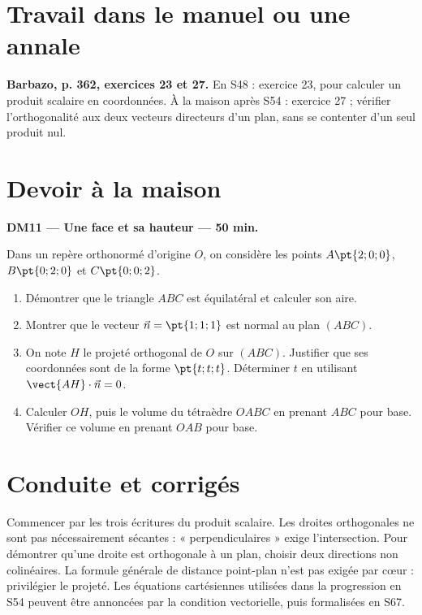 \section{Travail dans le manuel ou une annale}\textbf{Barbazo, p. 362, exercices 23 et 27.} En S48 : exercice 23, pour calculer un produit scalaire en coordonnées. À la maison après S54 : exercice 27 ; vérifier l'orthogonalité aux deux vecteurs directeurs d'un plan, sans se contenter d'un seul produit nul.

\mxnewpage
\section{Devoir à la maison}\textbf{DM11 --- Une face et sa hauteur --- 50 min.}\par Dans un repère orthonormé d'origine $O$, on considère les points $A\pt{2;0;0}$, $B\pt{0;2;0}$ et $C\pt{0;0;2}$.
\begin{enumerate}\item Démontrer que le triangle $ABC$ est équilatéral et calculer son aire.
\item Montrer que le vecteur $\vec n=\pt{1;1;1}$ est normal au plan $(ABC)$.
\item On note $H$ le projeté orthogonal de $O$ sur $(ABC)$. Justifier que ses coordonnées sont de la forme $\pt{t;t;t}$. Déterminer $t$ en utilisant $\vect{AH}\cdot\vec n=0$.
\item Calculer $OH$, puis le volume du tétraèdre $OABC$ en prenant $ABC$ pour base. Vérifier ce volume en prenant $OAB$ pour base.\end{enumerate}

\ifmxteacher\mxnewpage\section{Conduite et corrigés}\begin{teachernote}Commencer par les trois écritures du produit scalaire. Les droites orthogonales ne sont pas nécessairement sécantes : « perpendiculaires » exige l'intersection. Pour démontrer qu'une droite est orthogonale à un plan, choisir deux directions non colinéaires. La formule générale de distance point-plan n'est pas exigée par cœur : privilégier le projeté. Les équations cartésiennes utilisées dans la progression en S54 peuvent être annoncées par la condition vectorielle, puis formalisées en S67.\end{teachernote}

